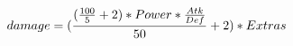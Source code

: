 \documentclass[preview]{standalone}
\begin{document}
\begin{align*}
\special{dvisvgm:raw <g id='unique000'>}damage = (\frac{(\frac{100}{5} + 2) * Power * \frac{Atk}{Def}}{50} + 2) * Extras\special{dvisvgm:raw </g>}
\end{align*}
\end{document}
